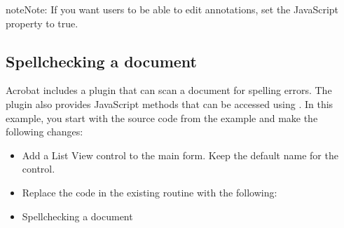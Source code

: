 \documentclass[letterpaper,12pt,english,openany,oneside]{sphinxmanual}
\begin{document}
\begin{sphinxadmonition}{note}{Note:}
If you want users to be able to edit annotations, set the JavaScript property  to true.
\end{sphinxadmonition}


\subsection{Spell\sphinxhyphen{}checking a document}
\label{\detokenize{IAC_DevApp_OLE_Support:spell-checking-a-document}}
Acrobat includes a plug\sphinxhyphen{}in that can scan a document for spelling errors. The plug\sphinxhyphen{}in also provides JavaScript methods that can be accessed using . In this example, you start with the source code from the example  and make the following changes:
\begin{itemize}
\item {} 
Add a List View control to the main form. Keep the default name  for the control.

\item {} 
Replace the code in the existing  routine with the following:

\item {} 
Spell\sphinxhyphen{}checking a document

\end{itemize}
\end{document}
